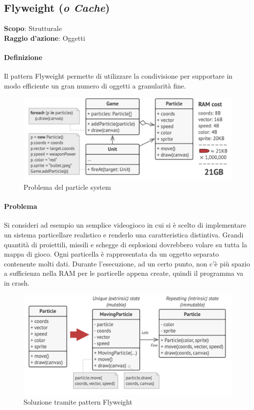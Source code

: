 \subsection{Flyweight (\textit{o Cache})}
\label{flyweight}

\textbf{Scopo}: Strutturale \\
\textbf{Raggio d'azione}: Oggetti

\paragraph{Definizione} Il pattern Flyweight permette di utilizzare la condivisione per supportare in modo efficiente un gran numero di oggetti a granularità fine.

\begin{figure}[H]
    \centering
    \includegraphics[width=1\linewidth]{assets/pattern/flyweight/flyweight-problema.png}
    \caption{Problema del particle system}
\end{figure}

\paragraph{Problema} Si consideri ad esempio un semplice videogioco in cui si è scelto di implementare un sistema particellare realistico e renderlo una caratteristica distintiva. Grandi quantità di proiettili, missili e schegge di esplosioni dovrebbero volare su tutta la mappa di gioco. Ogni particella è rappresentata da un oggetto separato contenente molti dati. Durante l’esecuzione, ad un certo punto, non c'è più spazio a sufficienza nella RAM per le particelle appena create, quindi il programma va in crash.

\begin{figure}[H]
    \centering
    \includegraphics[width=1\linewidth]{assets/pattern/flyweight/flyweight-soluzione.png}
    \caption{Soluzione tramite pattern Flyweight}
\end{figure}

